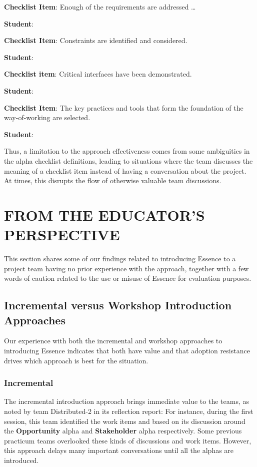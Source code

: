 \textbf{Checklist Item}: Enough of the requirements are addressed \ldots 

\textbf{Student}: 

\textbf{Checklist Item}: Constraints are identified and considered. 

\textbf{Student}: 

\textbf{Checklist item}: Critical interfaces have been demonstrated. 

\textbf{Student}: 

\textbf{Checklist Item}: The key practices and tools that form the foundation of the way-of-working are selected.

\textbf{Student}: 

Thus, a limitation to the approach effectiveness comes from some ambiguities in the alpha checklist definitions, leading to situations where the team discusses the meaning of a checklist item instead of having a conversation about the project. At times, this disrupts the flow of otherwise valuable team discussions.

\section{FROM THE EDUCATOR'S PERSPECTIVE}
This section shares some of our findings related to introducing Essence to a project team having no prior experience with the approach, together with a few words of caution related to the use or misuse of Essence for evaluation purposes.

\subsection{Incremental versus Workshop Introduction Approaches}

Our experience with both the incremental and workshop approaches to introducing Essence indicates that both have value and that adoption resistance drives which approach is best for the situation.

\subsubsection{Incremental}
The incremental introduction approach brings immediate value to the teams, as noted by team Distributed-2 in its reflection report:  For instance, during the first session, this team identified the work items  and  based on its discussion around the \textbf{Opportunity} alpha and \textbf{Stakeholder} alpha respectively. Some previous practicum teams overlooked these kinds of discussions and work items. However, this approach delays many important conversations until all the alphas are introduced.

